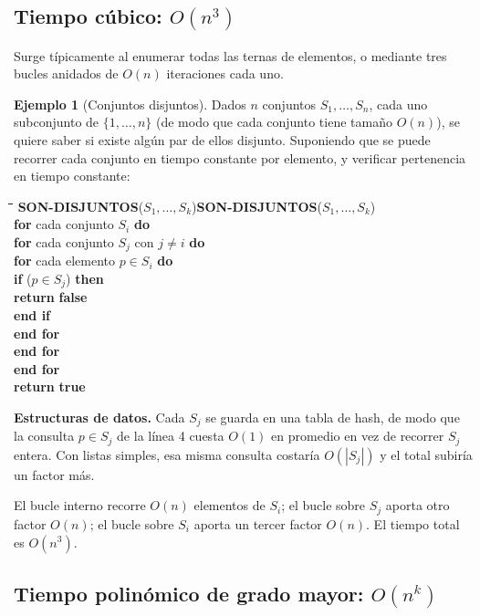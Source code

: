 \documentclass[12pt, spanish, oneside, openany]{book}
\newcommand{\pl}[1]{\makebox[1.6em][r]{\texttt{\footnotesize #1}}\hspace{0.9em}}
\newenvironment{pseudo}[1]{%
  \begin{center}%
  \begin{mdframed}[style=pseudobox]%
  \small
  \begin{tabbing}%
  \hspace{2.5em}\=\hspace{1.5em}\=\hspace{1.5em}\=\hspace{1.5em}\=\hspace{1.5em}\=\kill
  \def\pseudotitulo{#1}\ifx\pseudotitulo\empty\else#1\\[3pt]\fi}%
  {\end{tabbing}\end{mdframed}\end{center}}
\newenvironment{estructuras}%
  {\begin{center}\begin{minipage}{0.93\textwidth}\begin{mdframed}[style=estrbox]%
   \small\textbf{Estructuras de datos.}\;}%
  {\end{mdframed}\end{minipage}\end{center}}
\theoremstyle{uprightplain}
\theoremstyle{definition}
\newtheorem{ejemplo}[teorema]{Ejemplo}
\theoremstyle{remark}
\theoremstyle{definition}
\begin{document}
\subsection{Tiempo cúbico: $O(n^3)$}

Surge típicamente al enumerar todas las ternas de elementos, o mediante tres bucles anidados de $O(n)$ iteraciones cada uno.

\begin{ejemplo}[Conjuntos disjuntos]
\label{ej:conjuntos-disjuntos}
Dados $n$ conjuntos $S_1,\dots,S_n$, cada uno subconjunto de $\{1,\dots,n\}$ (de modo que cada conjunto tiene tamaño $O(n)$), se quiere saber si existe algún par de ellos disjunto. Suponiendo que se puede recorrer cada conjunto en tiempo constante por elemento, y verificar pertenencia en tiempo constante:
\begin{pseudo}{\textbf{SON-DISJUNTOS}($S_1,\dots,S_k$)}
\pl{1}\> \textbf{for} cada conjunto $S_i$ \textbf{do}\\
\pl{2}\>\> \textbf{for} cada conjunto $S_j$ con $j\ne i$ \textbf{do}\\
\pl{3}\>\>\> \textbf{for} cada elemento $p \in S_i$ \textbf{do}\\
\pl{4}\>\>\>\> \textbf{if} ($p \in S_j$) \textbf{then}\\
\pl{5}\>\>\>\>\> \textbf{return} \textbf{false}\\
\pl{6}\>\>\>\> \textbf{end if}\\
\pl{7}\>\>\> \textbf{end for}\\
\pl{8}\>\> \textbf{end for}\\
\pl{9}\> \textbf{end for}\\
\pl{10}\> \textbf{return} \textbf{true}
\end{pseudo}

\begin{estructuras}
Cada $S_j$ se guarda en una tabla de hash, de modo que la consulta
$p\in S_j$ de la línea 4 cuesta $O(1)$ en promedio en vez de recorrer $S_j$
entera. Con listas simples, esa misma consulta costaría $O(|S_j|)$ y el total
subiría un factor más.
\end{estructuras}
El bucle interno recorre $O(n)$ elementos de $S_i$; el bucle sobre $S_j$ aporta otro factor $O(n)$; el bucle sobre $S_i$ aporta un tercer factor $O(n)$. El tiempo total es $O(n^3)$.
\end{ejemplo}

\subsection{Tiempo polinómico de grado mayor: $O(n^k)$}
\end{document}

